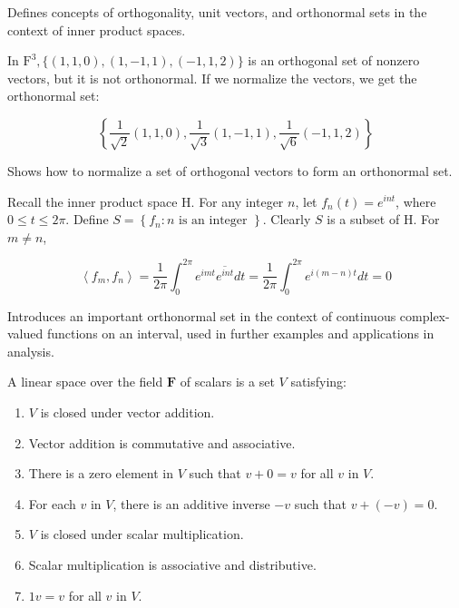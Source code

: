 \documentclass{report}
\begin{document}
    Defines concepts of orthogonality, unit vectors, and orthonormal sets in the context of inner product spaces.


    \begin{Example}
        In $\mathrm{F}^{3}, \{(1,1,0),(1,-1,1),(-1,1,2)\}$ is an orthogonal set of nonzero vectors, but it is not orthonormal. If we normalize the vectors, we get the orthonormal set:

        \[
        \left\{\frac{1}{\sqrt{2}}(1,1,0), \frac{1}{\sqrt{3}}(1,-1,1), \frac{1}{\sqrt{6}}(-1,1,2)\right\}
        \]
    \end{Example}

    Shows how to normalize a set of orthogonal vectors to form an orthonormal set.


    \begin{Example}
        Recall the inner product space $\mathrm{H}$. For any integer $n$, let $f_{n}(t)=e^{i n t}$, where $0 \leq t \leq 2 \pi$. Define $S=\left\{f_{n}: n \text { is an integer }\right\}$. Clearly $S$ is a subset of $\mathrm{H}$. For $m \neq n$,

        \[
        \left\langle f_{m}, f_{n}\right\rangle =\frac{1}{2 \pi} \int_{0}^{2 \pi} e^{i m t} \overline{e^{i n t}} d t=\frac{1}{2 \pi} \int_{0}^{2 \pi} e^{i(m-n) t} d t = 0
        \]
    \end{Example}

    Introduces an important orthonormal set in the context of continuous complex-valued functions on an interval, used in further examples and applications in analysis.

    \begin{defBox}
    A linear space over the field $\mathbf{F}$ of scalars is a set $V$ satisfying:
    \begin{enumerate}
        \item $V$ is closed under vector addition.
        \item Vector addition is commutative and associative.
        \item There is a zero element in $V$ such that $v + 0 = v$ for all $v$ in $V$.
        \item For each $v$ in $V$, there is an additive inverse $-v$ such that $v + (-v) = 0$.
        \item $V$ is closed under scalar multiplication.
        \item Scalar multiplication is associative and distributive.
        \item $1v = v$ for all $v$ in $V$.
    \end{enumerate}
    \end{defBox}
\end{document}
